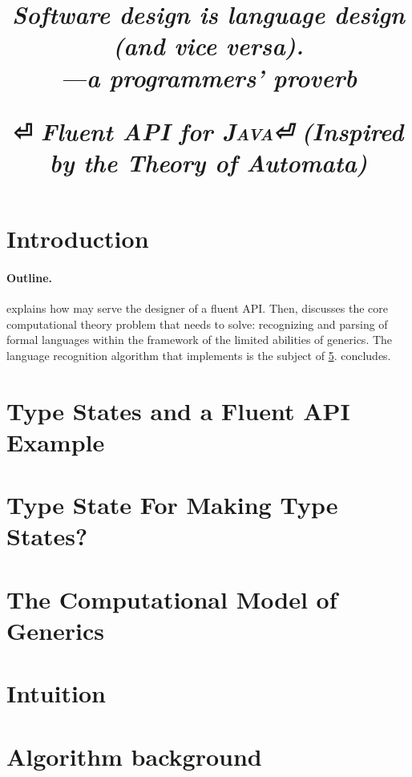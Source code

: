 \documentclass[nonatbib,preprint,numbers]{sigplanconf}
\title
{%
  \begin{flushright}
    \textcolor{blue!20!black}
    {\footnotesize\mdseries\slshape
      \renewcommand\baselinestretch{0.3}
      Software design is language design\\
      (and vice versa).\vspace{-4ex}\tiny\\
      \renewcommand\baselinestretch{0.3}
      ---a programmers' proverb
    }
  \end{flushright}
  \Huge \Fajita⏎
  \huge \itshape \textbf Fluent \textbf API for \textsc{\textbf Java}⏎
  \LARGE (\textbf Inspired by the \textbf Theory of \textbf Automata)
}
\begin{document}
\maketitle

\begin{abstract}
  
\end{abstract}

\section{Introduction}


\paragraph{Outline.}  explains how \Fajita may serve the
designer of a fluent API\@.
Then,  discusses the core computational theory problem
that \Fajita needs to solve: recognizing and parsing of formal languages within
the framework of the limited abilities of \Java generics.  The language
recognition algorithm that \Fajita implements is the subject of
\cref{section:intuition}.   concludes.

\section{Type States and a Fluent API Example}
\label{section:example}


\section{Type State For Making Type States?}
\label{section:generalization}


\section{The Computational Model of \protect\Java Generics}
\label{section:background}


\section{Intuition}
\label{section:intuition}


\section{Algorithm background}
\label{section:algorithm}

\end{document}

